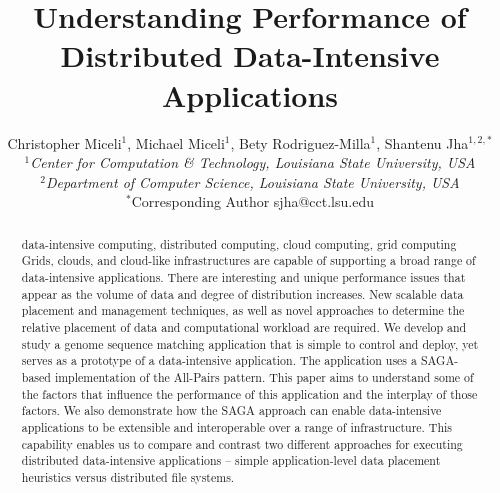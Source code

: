 \documentclass{rspublic}
\title[Understanding Performance of Distributed Data-Intensive
Applications]{Understanding Performance of Distributed Data-Intensive
  Applications}
\author[Miceli, Miceli, Rodriguez-Milla, Jha]{ Christopher Miceli$^{1}$,
Michael Miceli$^{1}$, Bety Rodriguez-Milla$^{1}$, Shantenu Jha$^{1,2,*}$ \\
\small{\emph{$^{1}$Center for Computation \& Technology, Louisiana State
University, USA}} \\  \small{\emph{$^{2}$Department of Computer Science,
Louisiana State University, USA}} \\ {\footnotesize {\hspace{0.0 in}
$^*$Corresponding Author sjha@cct.lsu.edu}} }
\begin{document}
 \maketitle

\begin{abstract}{data-intensive computing, distributed computing,
cloud computing, grid computing} 
Grids, clouds, and cloud-like infrastructures are capable of
supporting a broad range of data-intensive applications. There are
interesting and unique performance issues that appear as the volume of
data and degree of distribution increases. New scalable data placement
and management techniques, as well as novel approaches to determine
the relative placement of data and computational workload are
required.  We develop and study a genome sequence matching application
that is simple to control and deploy, yet serves as a prototype of a
data-intensive application. The application uses a SAGA-based
implementation of the All-Pairs pattern.  This paper aims to
understand some of the factors that influence the performance of this
application and the interplay of those factors. We also demonstrate
how the SAGA approach can enable data-intensive applications to be
extensible and interoperable over a range of infrastructure. This
capability enables us to compare and contrast two different approaches
for executing distributed data-intensive applications -- simple
application-level data placement heuristics versus distributed file
systems.


\end{abstract}
\end{document}
